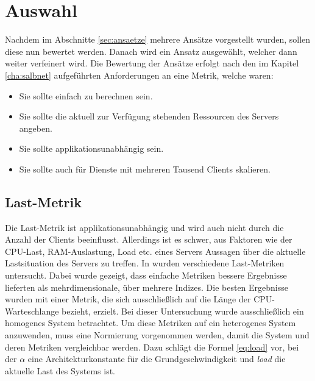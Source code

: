 \documentclass[a4paper, 12pt, BCOR10mm, DIV12, toc=bibliography, toc=listof, german]{scrbook}
\begin{document}
		

		\section{Auswahl} %
		\label{sec:auswahl}

		Nachdem im Abschnitte \ref{sec:ansaetze} mehrere Ansätze vorgestellt wurden, sollen diese nun
		bewertet werden. Danach wird ein Ansatz ausgewählt, welcher dann weiter verfeinert wird. Die
		Bewertung der Ansätze erfolgt nach den im Kapitel \ref{cha:salbnet} aufgeführten Anforderungen
		an eine Metrik, welche waren:

		\begin{itemize}
			\item Sie sollte einfach zu berechnen sein.
			\item Sie sollte die aktuell zur Verfügung stehenden Ressourcen des Servers angeben.
			\item Sie sollte applikationsunabhängig sein.
			\item Sie sollte auch für Dienste mit mehreren Tausend Clients skalieren.
		\end{itemize}

		\subsection*{Last-Metrik} %

		Die Last-Metrik ist applikationsunabhängig und wird auch nicht durch die Anzahl der Clients
		beeinflusst. Allerdings ist es schwer, aus Faktoren wie der CPU-Last, RAM-Auslastung, Load etc.
		eines Servers Aussagen über die aktuelle Lastsituation des Servers zu treffen. In
		\cite{kunz1991} wurden verschiedene Last-Metriken untersucht. Dabei wurde gezeigt, dass einfache
		Metriken bessere Ergebnisse lieferten als mehrdimensionale, über mehrere Indizes. Die
		besten Ergebnisse wurden mit einer Metrik, die sich ausschließlich auf die Länge der
		CPU-Warteschlange bezieht, erzielt. Bei dieser Untersuchung wurde ausschließlich ein homogenes System
		betrachtet. Um diese Metriken auf ein heterogenes System anzuwenden, muss eine Normierung
		vorgenommen werden, damit die System und deren Metriken vergleichbar werden. Dazu schlägt
		\cite{lansch1994} die Formel \ref{eq:load} vor, bei der $\alpha$ eine Architekturkonstante für
		die Grundgeschwindigkeit und \textit{load} die aktuelle Last des Systems ist.
\end{document}
